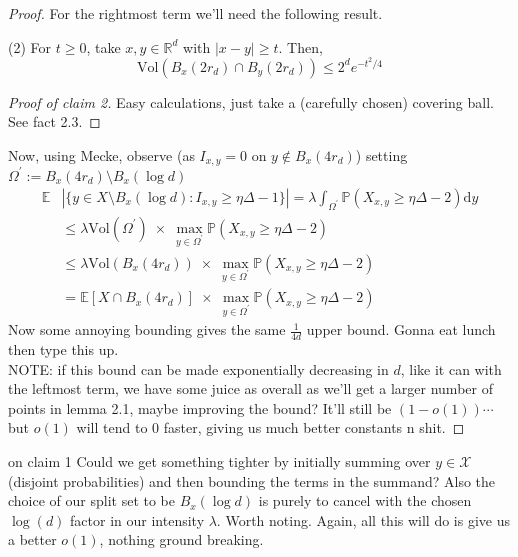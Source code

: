 \documentclass{article}
\begin{document}
\begin{proof}
    For the rightmost term we'll need the following result. 
    \begin{claim}[]{(2)}
        For $t \geq 0$, take $x, y \in \mathbb{R}^d$ with $\lvert x - y \rvert \geq t$. Then,
        \[\text{Vol}(B_x(2r_d)\cap B_y(2r_d)) \leq 2^d e^{-t^2/4}\]
    \end{claim}
    \begin{proof}[Proof of claim 2]
        Easy calculations, just take a (carefully chosen) covering ball. See \cite{campos2023} fact 2.3.
    \end{proof}
    Now, using Mecke, observe (as $I_{x,y} = 0$ on $y \notin B_{x}(4r_d)$) setting $\Omega^\prime 
    := B_x(4r_d) \setminus B_x(\log d)$
    \begin{align*}
        \mathbb{E}&|\{y \in X \setminus B_x(\log d) : I_{x,y} \geq \eta \Delta - 1\}| 
        = \lambda \int_{\Omega^\prime}\mathbb{P}(X_{x,y} \geq \eta \Delta - 2)\mathrm{d}y \\
        &\leq \lambda \text{Vol}(\Omega^\prime) \; \times \;\max_{y \in \Omega^\prime}\mathbb{P}(X_{x,y} \geq \eta \Delta - 2) \\
        &\leq \lambda \text{Vol}(B_x(4r_d)) \; \times \; \max_{y \in \Omega^\prime}\mathbb{P}(X_{x,y} \geq \eta \Delta - 2) \\
        &= \mathbb{E}[X \cap B_x(4r_d)] \; \times \; \max_{y \in \Omega^\prime}\mathbb{P}(X_{x,y} \geq \eta \Delta - 2)
    \end{align*}
    Now some annoying bounding gives the same $\frac{1}{4d}$ upper bound. Gonna eat lunch then type this up. \\

    NOTE: if this bound can be made exponentially decreasing in $d$, like it can with the leftmost term, we 
    have some juice as overall as we'll get a larger number of points in lemma 2.1, maybe 
    improving the bound? It'll still be $(1-o(1))\cdots$ but $o(1)$ will tend to $0$ 
    faster, giving us much better constants n shit. 
\end{proof}

\begin{remark}[]{on claim 1}
    Could we get something tighter by initially summing over $y \in \mathcal{X}$ (disjoint probabilities) and 
    then bounding the terms in the summand? Also the choice of our split set to be $B_x(\log d)$ is purely to 
    cancel with the chosen $\log(d)$ factor in our intensity $\lambda$. Worth noting. Again, all this will do is 
    give us a better $o(1)$, nothing ground breaking. 
\end{remark}
\end{document}
